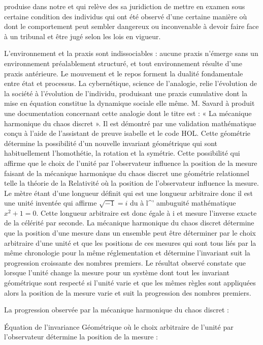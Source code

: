 \documentclass[12pt,a4paper]{article}
\begin{document}
produise dans notre et qui relève des sa juridiction de mettre en examen sous certaine condition des individus qui ont été observé d’une certaine manière où dont le comportement peut sembler dangereux ou inconvenable à devoir faire face à un tribunal et être jugé selon les lois en vigueur.

L’environnement et la praxis sont indissociables : aucune praxis n’émerge sans un environnement préalablement structuré, et tout environnement résulte d’une praxis antérieure. Le mouvement et le repos forment la dualité fondamentale entre état et processus. La cybernétique, science de l’analogie, relie l’évolution de la société à l’évolution de l’individu, produisant une praxis cumulative dont la mise en équation constitue la dynamique sociale elle même. M. Savard à produit une documentation concernant cette analogie dont le titre est : «  La mécanique harmonique du chaos discret ». Il est démontré par une validation mathématique conçu à l’aide de l’assistant de preuve isabelle et le code HOL. Cette géométrie détermine la possibilité d’un nouvelle invariant géométrique qui sont habituellement l’homothétie, la rotation et la symétrie. Cette possibilité qui affirme que le choix de l’unité par l’observateur influence la position de la mesure faisant de la mécanique harmonique du chaos discret une géométrie relationnel telle la théorie de la Relativité où la position de l’observateur influence la mesure.  Le mètre étant d’une longueur définit qui est une longueur arbitraire donc il est une unité inventée qui affirme $\sqrt{-1}=i$ du à l\textasciicircum{}' ambuguité mathématique $x^2+1=0$. Cette longueur arbitraire est donc égale à i et mesure l’inverse exacte de la célérité par seconde. La mécanique harmonique du chaos discret détermine que la position d’une mesure dans un ensemble peut être déterminer par le choix arbitraire d’une unité et que les positions de ces mesures qui sont tous liés par la même chronologie pour la même réglementation et détermine l’invariant suit  la progression croissante des nombres premiers. Le résultat observé constate que lorsque l’unité change la mesure pour un système dont tout les invariant géométrique sont respecté si l’unité varie et que les mêmes règles sont appliquées alors la position de la mesure varie et suit la progression des nombres premiers.

La progression observée par la mécanique harmonique du chaos discret :

Équation de l’invariance Géométrique où le choix arbitraire de l’unité par l’observateur détermine la position de la mesure :
\end{document}
